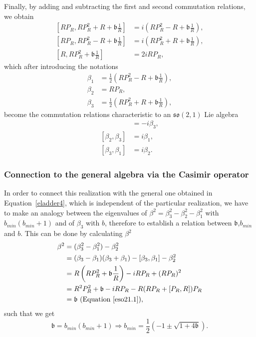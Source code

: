 \documentclass[12pt,a4paper]{report}
\theoremstyle{definition}
\theoremstyle{remark}
\theoremstyle{remark}
\begin{document}
Finally, by adding and subtracting the first and second commutation relations, we obtain
\begin{align*}
\left[RP_R,RP_R^2+R+\mathfrak{b}\frac{1}{R}\right]&=i\left(RP_R^2-R+\mathfrak{b}\frac{1}{R}\right),\\
\left[RP_R,RP_R^2-R+\mathfrak{b}\frac{1}{R}\right]&=i\left(RP_R^2+R+\mathfrak{b}\frac{1}{R}\right),\\
\left[R,RP_R^2+\mathfrak{b}\frac{1}{R}\right]&=2iRP_R,
\end{align*}
which after introducing the notations
\begin{equation}\label{so21.5}
\begin{aligned}
\beta_1&=\frac{1}{2}\left(RP_R^2-R+\mathfrak{b}\frac{1}{R}\right), \\
\beta_2&=RP_R, \\
\beta_3&=\frac{1}{2}\left(RP_R^2+R+\mathfrak{b}\frac{1}{R}\right),
\end{aligned}
\end{equation}
become the commutation relations characteristic to an $\mathfrak{so}(2,1)$ Lie algebra
\begin{align*}
[\beta_1,\beta_2]&=-i\beta_3, \\
[\beta_2,\beta_3]&=i\beta_1, \\
[\beta_3,\beta_1]&=i\beta_2. 
\end{align*}

\subsubsection{Connection to the general algebra via the Casimir operator}
In order to connect this realization with the general one obtained in Equation~\ref{eladder4}, which is independent of the particular realization, we have to make an analogy between the eigenvalues of $\beta^2=\beta_3^2-\beta_2^2-\beta_1^2$ with $b_{min}(b_{min}+1)$ and of $\beta_3$ with $b$, therefore to establish a relation between $\mathfrak{b}$,$b_{min}$ and $b$. This can be done by calculating $\beta^2$
\begin{align*}
\beta^2&=(\beta_3^2-\beta_1^2)-\beta_2^2 \\
&=(\beta_3-\beta_1)(\beta_3+\beta_1)-[\beta_3,\beta_1]-\beta_2^2\\
&=R\left(RP_R^2+\mathfrak{b}\frac{1}{R}\right)-iRP_R+(RP_R)^2\\
&=R^2P_R^2+\mathfrak{b}-iRP_R-R(RP_R+[P_R,R])P_R\\
&=\mathfrak{b} \text{ (Equation~\ref{eso21.1})},
\end{align*}
such that we get
\begin{equation}\label{eso21.3}
\mathfrak{b}=b_{min}(b_{min}+1)\Rightarrow b_{min}=\frac{1}{2}\left(-1\pm\sqrt{1+4\mathfrak{b}}\right).
\end{equation}
\end{document}
